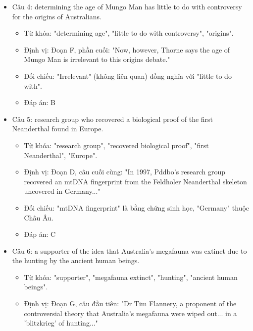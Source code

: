 \documentclass{../templateReading/cdreading}
\begin{document}
\begin{itemize}
\begin{itemize}
\item Từ khóa: "age of Mungo Man", "much younger", "former result", "older than 62,000".
\item Định vị: Đoạn B và C. Đoạn B nói Jim Bowler kết luận "graves are 40,000 years old". Đoạn C so sánh: "This is much younger than the 62,000 years Mungo Man was attributed... by... Alan Thorne".
\item Đối chiếu: Người đưa ra kết quả trẻ hơn (40,000 năm) so với kết quả cũ (62,000 năm) là Jim Bowler.
\item Đáp án: A
\end{itemize}
\item Câu 4: determining the age of Mungo Man has little to do with controversy for the origins of Australians.
\begin{itemize}
\item Từ khóa: "determining age", "little to do with controversy", "origins".
\item Định vị: Đoạn F, phần cuối: "Now, however, Thorne says the age of Mungo Man is irrelevant to this origins debate."
\item Đối chiếu: "Irrelevant" (không liên quan) đồng nghĩa với "little to do with".
\item Đáp án: B
\end{itemize}
\item Câu 5: research group who recovered a biological proof of the first Neanderthal found in Europe.
\begin{itemize}
\item Từ khóa: "research group", "recovered biological proof", "first Neanderthal", "Europe".
\item Định vị: Đoạn D, câu cuối cùng: "In 1997, Pddbo’s research group recovered an mtDNA fingerprint from the Feldholer Neanderthal skeleton uncovered in Germany..."
\item Đối chiếu: "mtDNA fingerprint" là bằng chứng sinh học, "Germany" thuộc Châu Âu.
\item Đáp án: C
\end{itemize}
\item Câu 6: a supporter of the idea that Australia’s megafauna was extinct due to the hunting by the ancient human beings.
\begin{itemize}
\item Từ khóa: "supporter", "megafauna extinct", "hunting", "ancient human beings".
\item Định vị: Đoạn G, câu đầu tiên: "Dr Tim Flannery, a proponent of the controversial theory that Australia’s megafauna were wiped out... in a 'blitzkrieg' of hunting..."

\end{itemize}
\end{itemize}
\end{document}
